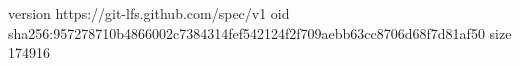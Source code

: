 version https://git-lfs.github.com/spec/v1
oid sha256:957278710b4866002c7384314fef542124f2f709aebb63cc8706d68f7d81af50
size 174916
